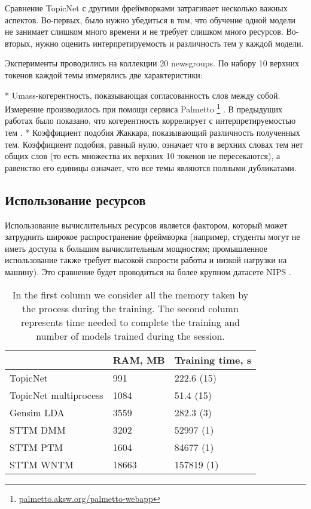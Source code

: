 Сравнение TopicNet с другими фреймворками затрагивает несколько важных аспектов. Во-первых, было нужно убедиться в том, что обучение одной модели не занимает слишком много времени и не требует слишком много ресурсов. Во-вторых, нужно оценить интерпретируемость и различность тем у каждой модели.

Эксперименты проводились на коллекции 20 newsgroups. По набору 10 верхних токенов каждой темы измерялись две характеристики: 

* Umass-когерентность, показывающая согласованность слов между собой. Измерение производилось при помощи сервиса Palmetto \footnote{\url{palmetto.aksw.org/palmetto-webapp} } \cite{roder2015exploring}. В предыдущих работах было показано, что когерентность коррелирует с интерпретируемостью тем \cite{mimno2011}.
* Коэффициент подобия Жаккара, показывающий различность полученных тем. Коэффициент подобия, равный нулю, означает что в верхних словах тем нет общих слов (то есть множества их верхних 10 токенов не пересекаются), а равенство его единицы означает, что все темы являются полными дубликатами.

\subsection{Использование ресурсов}

Использование вычислительных ресурсов является фактором, который может затруднить широкое распространение фреймворка (например, студенты могут не иметь доступа к большим вычислительным мощностям; промышленное  использование также требует высокой скорости работы и низкой нагрузки на машину). Это сравнение будет проводиться на более крупном датасете NIPS \cite{mccallum1996bow}. 
 
\begin{table}[h]
\begin{tabular}{|l|l|l|}
\hline
                      & \multicolumn{1}{c|}{RAM, MB} & \multicolumn{1}{c|}{Training time, s} \\ \hline
TopicNet              & 991                         & 222.6 (15)                             \\ \hline
TopicNet multiprocess & 1084                        & 51.4 (15)                              \\ \hline
Gensim LDA            & 3559                        & 282.3 (3)                              \\ \hline
STTM DMM              & 3202                        & 52997 (1)                              \\ \hline
STTM PTM              & 1604                        & 84677 (1)                              \\ \hline
STTM WNTM             & 18663                       & 157819 (1)                             \\ \hline
\end{tabular}
\caption{In the first column we consider all the memory taken by the process during the training. The second column represents time needed to complete the training and number of models trained during the session.}
\label{performance-benchmark}
\end{table}

